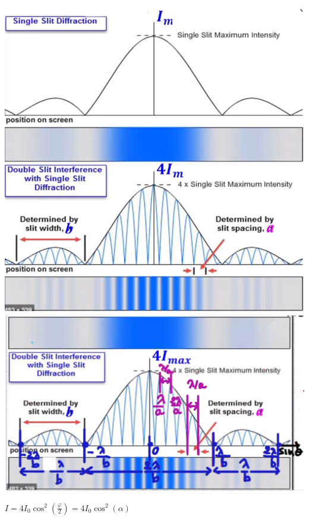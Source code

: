 \documentclass[12pt]{book}
\begin{document}
            \begin{center}
                \begin{minipage}{0.5\linewidth}
                    \includegraphics[width=\linewidth]{pic/interferencediffraction.png}
                    \includegraphics[width=\linewidth]{pic/interferencediffractiondescription.png}
                \end{minipage}
                \begin{minipage}{0.49\linewidth}
                    $ I = 4I_0\cos^2(\frac{\varphi}{2})=4I_0\cos^2(\alpha) $\\

\end{minipage}
\end{center}
\end{document}
